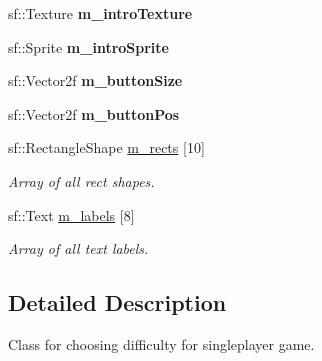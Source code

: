 \begin{DoxyCompactItemize}
\item 
sf\+::\+Texture {\bfseries m\+\_\+intro\+Texture}\hypertarget{classDifficulty__Singleplayer__State_a50b5cb9364fddc011f944574d6215bd0}{}\label{classDifficulty__Singleplayer__State_a50b5cb9364fddc011f944574d6215bd0}

\item 
sf\+::\+Sprite {\bfseries m\+\_\+intro\+Sprite}\hypertarget{classDifficulty__Singleplayer__State_aeca48137c3a4c57ea2927157895ab2a0}{}\label{classDifficulty__Singleplayer__State_aeca48137c3a4c57ea2927157895ab2a0}

\item 
sf\+::\+Vector2f {\bfseries m\+\_\+button\+Size}\hypertarget{classDifficulty__Singleplayer__State_ace34b59098054a0a25c650d11ef1697a}{}\label{classDifficulty__Singleplayer__State_ace34b59098054a0a25c650d11ef1697a}

\item 
sf\+::\+Vector2f {\bfseries m\+\_\+button\+Pos}\hypertarget{classDifficulty__Singleplayer__State_a110abcc8af3f2094e9565e8a7752db9a}{}\label{classDifficulty__Singleplayer__State_a110abcc8af3f2094e9565e8a7752db9a}

\item 
sf\+::\+Rectangle\+Shape \hyperlink{classDifficulty__Singleplayer__State_aef1a8cfbbe77a71d22215997090c355a}{m\+\_\+rects} \mbox{[}10\mbox{]}\hypertarget{classDifficulty__Singleplayer__State_aef1a8cfbbe77a71d22215997090c355a}{}\label{classDifficulty__Singleplayer__State_aef1a8cfbbe77a71d22215997090c355a}

\begin{DoxyCompactList}\small\item\em Array of all rect shapes. \end{DoxyCompactList}\item 
sf\+::\+Text \hyperlink{classDifficulty__Singleplayer__State_acdb8982e8f00a54f690429244b5a0961}{m\+\_\+labels} \mbox{[}8\mbox{]}\hypertarget{classDifficulty__Singleplayer__State_acdb8982e8f00a54f690429244b5a0961}{}\label{classDifficulty__Singleplayer__State_acdb8982e8f00a54f690429244b5a0961}

\begin{DoxyCompactList}\small\item\em Array of all text labels. \end{DoxyCompactList}\end{DoxyCompactItemize}


\subsection{Detailed Description}
Class for choosing difficulty for singleplayer game. 

